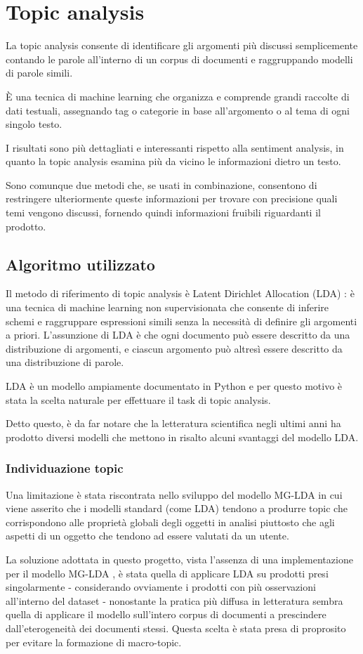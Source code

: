 \chapter{Topic analysis}
La topic analysis consente di identificare gli argomenti più discussi semplicemente contando le parole all’interno di un corpus di documenti e raggruppando modelli di parole simili. 
\par 
È una tecnica di machine learning che organizza e comprende grandi raccolte di dati testuali, assegnando tag o categorie in base all’argomento o al tema di ogni singolo testo. 
\par 
I risultati sono più dettagliati e interessanti rispetto alla sentiment analysis, in quanto la topic analysis esamina più da vicino le informazioni dietro un testo.
\par
Sono comunque due metodi che, se usati in combinazione, consentono di restringere ulteriormente queste informazioni per trovare con precisione quali temi vengono discussi, fornendo quindi informazioni fruibili riguardanti il prodotto.

\section{Algoritmo utilizzato}
Il metodo di riferimento di topic analysis è Latent Dirichlet Allocation (LDA) \cite{blei2003latent}: è una tecnica di machine learning non supervisionata che consente di inferire schemi e raggruppare espressioni simili senza la necessità di definire gli argomenti a priori. L'assunzione di LDA è che ogni documento può essere descritto da una distribuzione di argomenti, e ciascun argomento può altresì essere descritto da una distribuzione di parole.
\par
LDA è un modello ampiamente documentato in Python e per questo motivo è stata la scelta naturale per effettuare il task di topic analysis. 
\par 
Detto questo, è da far notare che la letteratura scientifica negli ultimi anni ha prodotto diversi modelli che mettono in risalto alcuni svantaggi del modello LDA. 
\subsection{Individuazione topic}
\label{indiv_topic}
Una limitazione è stata riscontrata nello sviluppo del modello MG-LDA in cui viene asserito che i modelli standard (come LDA) tendono a produrre topic che corrispondono alle proprietà globali degli oggetti in analisi piuttosto che agli aspetti di un oggetto che tendono ad essere valutati da un utente. 
\par
La soluzione adottata in questo progetto, vista l'assenza di una implementazione per il modello MG-LDA \cite{titov2008joint}, è stata quella di applicare LDA su prodotti presi singolarmente - considerando ovviamente i prodotti con più osservazioni all'interno del dataset - nonostante la pratica più diffusa in letteratura sembra quella di applicare il modello sull'intero corpus di documenti a prescindere dall'eterogeneità dei documenti stessi. Questa scelta è stata presa di proprosito per evitare la formazione di macro-topic.
